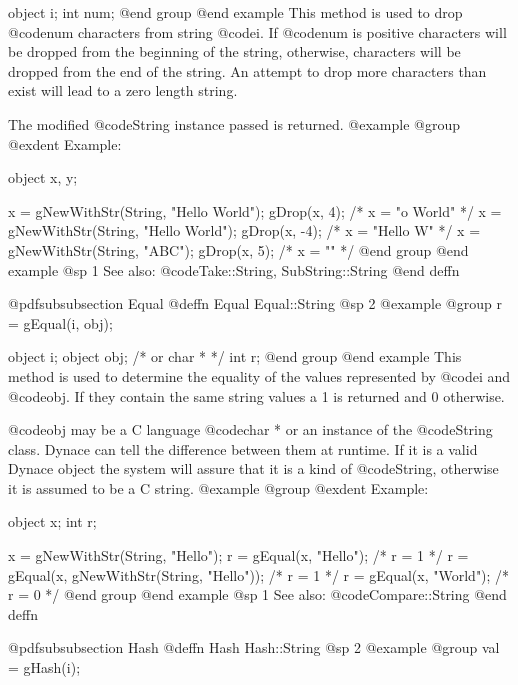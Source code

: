 object  i;
int     num;
@end group
@end example
This method is used to drop @code{num} characters from string @code{i}.
If @code{num} is positive characters will be dropped from the beginning
of the string, otherwise, characters will be dropped from the end of the
string.  An attempt to drop more characters than exist will lead to a
zero length string.

The modified @code{String} instance passed is returned.
@example
@group
@exdent Example:

object  x, y;

x = gNewWithStr(String, "Hello World");
gDrop(x, 4);   /*  x = "o World"    */
x = gNewWithStr(String, "Hello World");
gDrop(x, -4);   /*  x = "Hello W"    */
x = gNewWithStr(String, "ABC");
gDrop(x, 5);   /*  x = ""    */
@end group
@end example
@sp 1
See also:  @code{Take::String, SubString::String}
@end deffn










@pdfsubsubsection {Equal}
@deffn {Equal} Equal::String
@sp 2
@example
@group
r = gEqual(i, obj);

object  i;
object  obj;  /*  or char *  */
int     r;
@end group
@end example
This method is used to determine the equality of the values represented
by @code{i} and @code{obj}.  If they contain the same string values a
1 is returned and 0 otherwise.

@code{obj} may be a C language @code{char *} or an instance of the
@code{String} class.  Dynace can tell the difference between them at
runtime.  If it is a valid Dynace object the system will assure that it is
a kind of @code{String}, otherwise it is assumed to be a C string.
@example
@group
@exdent Example:

object  x;
int     r;

x = gNewWithStr(String, "Hello");
r = gEqual(x, "Hello");                /*  r = 1  */
r = gEqual(x, gNewWithStr(String, "Hello"));  /*  r = 1  */
r = gEqual(x, "World");                /*  r = 0  */
@end group
@end example
@sp 1
See also:  @code{Compare::String}
@end deffn














@pdfsubsubsection {Hash}
@deffn {Hash} Hash::String
@sp 2
@example
@group
val = gHash(i);


